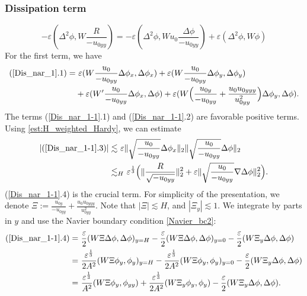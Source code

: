 \documentclass[reqno, 11pt]{amsart}
\theoremstyle{plain}
\theoremstyle{definition}
\theoremstyle{remark}
\numberwithin{equation}{section}
\begin{document}
\subsubsection{Dissipation term}
\begin{equation}\label{Dis_nar_1}
-\varepsilon(\Delta^2 \phi,  W \frac{R}{-u_{0yy}}) = - \varepsilon (\Delta^2 \phi, W u_0 \frac{\Delta \phi}{-u_{0yy}}) + \varepsilon (\Delta^2 \phi, W \phi)
\end{equation}
For the first term, we have
\begin{equation}\label{Dis_nar_1-1}
\begin{aligned}
(\ref{Dis_nar_1}.1) =& ~\varepsilon (W \frac{u_0}{-u_{0yy}} \Delta \phi_x, \Delta \phi_x) + \varepsilon (W\frac{u_0}{-u_{0yy}} \Delta \phi_y, \Delta \phi_y)\\
&+  \varepsilon (W' \frac{u_0}{-u_{0yy}} \Delta \phi_x, \Delta \phi)  +  \varepsilon (W \Big( \frac{u_{0y}}{-u_{0yy}} + \frac{u_0u_{0yyy}}{u_{0yy}^2} \Big) \Delta \phi_y, \Delta \phi).
\end{aligned}
\end{equation}
The terms (\ref{Dis_nar_1-1}.1) and (\ref{Dis_nar_1-1}.2) are favorable positive terms. Using \eqref{est:H_weighted_Hardy}, we can estimate
\begin{equation}\label{Dis_nar_1-1-1}
\begin{aligned}
|(\ref{Dis_nar_1-1}.3)| \lesssim &~ \varepsilon \| \sqrt{\frac{u_0}{-u_{0yy}}} \Delta \phi_x\|_2 \|  \sqrt{\frac{u_0}{-u_{0yy}}}\Delta \phi \|_2\\
\lesssim &_H~ \varepsilon^{\frac{1}{3}} \Big( \|\frac{R}{\sqrt{-u_{0yy}}}\|_2^2 + \varepsilon \| \sqrt{\frac{u_0}{-u_{0yy}}} \nabla\Delta \phi\|_2^2\Big).
\end{aligned}
\end{equation}
(\ref{Dis_nar_1-1}.4) is the crucial term. For simplicity of the presentation, we denote $\Xi := \frac{u_{0y}}{-u_{0yy}} + \frac{u_0u_{0yyy}}{u_{0yy}^2}$. Note that $|\Xi| \lesssim H$, and $|\Xi_y| \lesssim 1$. We integrate by parts in $y$ and use the Navier boundary condition \eqref{Navier_bc2}:
\begin{equation}\label{Dis_nar_1-1-2}
\begin{aligned}
(\ref{Dis_nar_1-1}.4) =& ~\frac{\varepsilon}{2} (W \Xi \Delta \phi , \Delta \phi)_{y=H} - \frac{\varepsilon}{2} (W \Xi \Delta \phi , \Delta \phi)_{y=0} - \frac{\varepsilon}{2} (W \Xi_y \Delta \phi, \Delta \phi) \\
=& ~\frac{\varepsilon^{\frac{1}{3}}}{2A^2} (W \Xi \phi_y ,\phi_y)_{y=H} - \frac{\varepsilon^{\frac{1}{3}}}{2A^2} (W \Xi \phi_y ,\phi_y)_{y=0} - \frac{\varepsilon}{2} (W \Xi_y \Delta \phi, \Delta \phi)\\
=& ~\frac{\varepsilon^{\frac{1}{3}}}{A^2} (W \Xi \phi_y ,\phi_{yy}) + \frac{\varepsilon^{\frac{1}{3}}}{2A^2} (W \Xi_y \phi_y ,\phi_y) - \frac{\varepsilon}{2} (W \Xi_y \Delta \phi, \Delta \phi).
\end{aligned}
\end{equation}
\end{document}
